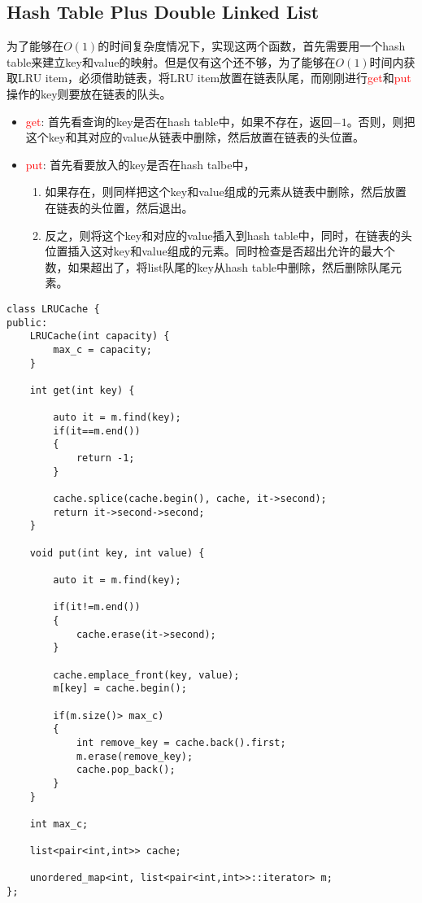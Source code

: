 \subsection{Hash Table Plus Double Linked List}
为了能够在$O(1)$的时间复杂度情况下，实现这两个函数，首先需要用一个hash table来建立key和value的映射。但是仅有这个还不够，为了能够在$O(1)$时间内获取LRU item，必须借助链表，将LRU item放置在链表队尾，而刚刚进行\textcolor{red}{get}和\textcolor{red}{put}操作的key则要放在链表的队头。
\begin{itemize}
    \item \textcolor{red}{get}: 首先看查询的key是否在hash table中，如果不存在，返回$-1$。否则，则把这个key和其对应的value从链表中删除，然后放置在链表的头位置。
    \item \textcolor{red}{put}: 首先看要放入的key是否在hash talbe中，
    \begin{enumerate}
        \item 如果存在，则同样把这个key和value组成的元素从链表中删除，然后放置在链表的头位置，然后退出。
        \item 反之，则将这个key和对应的value插入到hash table中，同时，在链表的头位置插入这对key和value组成的元素。同时检查是否超出允许的最大个数，如果超出了，将list队尾的key从hash table中删除，然后删除队尾元素。
    \end{enumerate}
\end{itemize}
\begin{lstlisting}[style=customc]
class LRUCache {
public:
    LRUCache(int capacity) {
        max_c = capacity;
    }
    
    int get(int key) {
        
        auto it = m.find(key);
        if(it==m.end())
        {
            return -1;
        }
        
        cache.splice(cache.begin(), cache, it->second);
        return it->second->second;
    }
    
    void put(int key, int value) {
        
        auto it = m.find(key);
        
        if(it!=m.end())
        {
            cache.erase(it->second);
        }
        
        cache.emplace_front(key, value);
        m[key] = cache.begin();
        
        if(m.size()> max_c)
        {
            int remove_key = cache.back().first;
            m.erase(remove_key);
            cache.pop_back();
        }
    }
    
    int max_c;
		
	list<pair<int,int>> cache;
		
	unordered_map<int, list<pair<int,int>>::iterator> m;
};
\end{lstlisting}